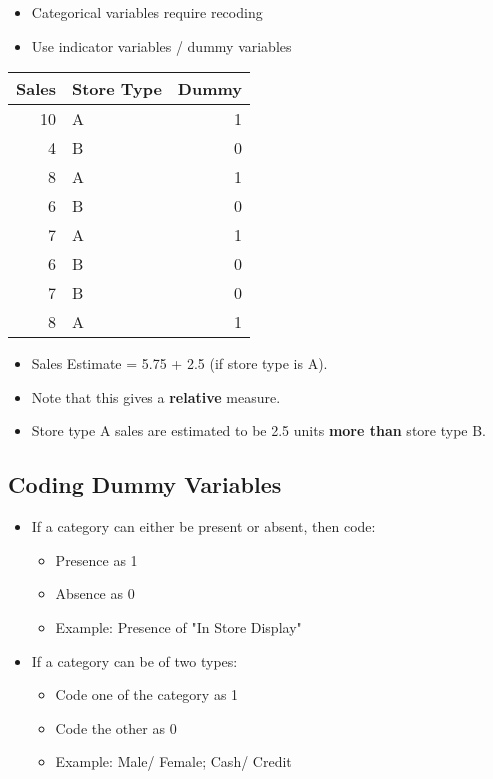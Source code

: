\documentclass[10pt,article]{article}
\begin{document}
\begin{itemize}
\item Categorical variables require recoding
\item Use indicator variables / dummy variables
\end{itemize}

{\small
\begin{center}
\begin{tabular}{rlr}
Sales & Store Type & Dummy\\
\hline
10 & A & 1\\
4 & B & 0\\
8 & A & 1\\
6 & B & 0\\
7 & A & 1\\
6 & B & 0\\
7 & B & 0\\
8 & A & 1\\
\end{tabular}
\end{center}
}
\begin{itemize}
\item Sales Estimate = 5.75 + 2.5 \texttimes{} (if store type is A).
\item Note that this gives a  {\bf relative} measure.
\item Store type A sales are estimated to be 2.5 units  {\bf more than} store type B.
\end{itemize}
\subsection{Coding Dummy Variables}
\label{sec:org071984c}
\begin{itemize}
\item If a category can either be present or absent, then code:
\begin{itemize}
\item Presence as 1
\item Absence as 0
\item Example: Presence of "In Store Display"
\end{itemize}
\item If a category can be of two types:
\begin{itemize}
\item Code one of the category as 1
\item Code the other as 0
\item Example: Male/ Female; Cash/ Credit
\end{itemize}
\end{itemize}
\end{document}
